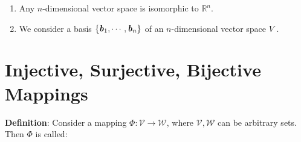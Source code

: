 \begin{enumerate}
    \item Any $n$-dimensional vector space is isomorphic to $\mathbb{R}^n$.
    \hfill \cite{mfml/book/mml/Deisenroth-Faisal-Ong}

    \item We consider a basis $\left\{\text{\textbf{\textit{b}}}_1, \cdots , \text{\textbf{\textit{b}}}_n\right\}$ of an $n$-dimensional vector space $V$ .
    \hfill \cite{mfml/book/mml/Deisenroth-Faisal-Ong}    
\end{enumerate}











\section{Injective, Surjective, Bijective Mappings}

\textbf{Definition}: Consider a mapping $\Phi : \mathcal{V} \to \mathcal{W}$, where $\mathcal{V}, \mathcal{W}$ can be arbitrary sets. 
Then $\Phi$ is called:
\hfill \cite{mfml/book/mml/Deisenroth-Faisal-Ong}

